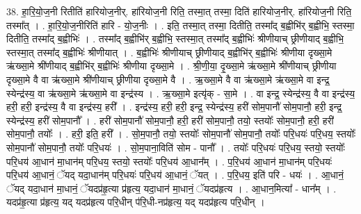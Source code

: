 \documentclass[17pt]{extarticle}
\begin{document}
38. हा॒रि॒यो॒ज॒नी रितीति॑ हारियोज॒नीर्. हा॑रियोज॒नी रिति॒ तस्मा॒त् तस्मा॒ दिति॑ हारियोज॒नीर्. हा॑रियोज॒नी रिति॒ तस्मा᳚त् । . हा॒रि॒यो॒ज॒नीरिति॑ हारि - यो॒ज॒नीः । . इति॒ तस्मा॒त् तस्मा॒ दितीति॒ तस्मा᳚द् ब॒ह्वीभि॑र् ब॒ह्वीभि॒ स्तस्मा॒ दितीति॒ तस्मा᳚द् ब॒ह्वीभिः॑ । . तस्मा᳚द् ब॒ह्वीभि॑र् ब॒ह्वीभि॒ स्तस्मा॒त् तस्मा᳚द् ब॒ह्वीभिः॑ श्रीणीयाच् छ्रीणीयाद् ब॒ह्वीभि॒ स्तस्मा॒त् तस्मा᳚द् ब॒ह्वीभिः॑ श्रीणीयात् । . ब॒ह्वीभिः॑ श्रीणीयाच् छ्रीणीयाद् ब॒ह्वीभि॑र् ब॒ह्वीभिः॑ श्रीणीया दृख्सा॒मे ऋ॑ख्सा॒मे श्री॑णीयाद् ब॒ह्वीभि॑र् ब॒ह्वीभिः॑ श्रीणीया दृख्सा॒मे । . श्री॒णी॒या॒ दृ॒ख्सा॒मे ऋ॑ख्सा॒मे श्री॑णीयाच् छ्रीणीया दृख्सा॒मे वै वा ऋ॑ख्सा॒मे श्री॑णीयाच् छ्रीणीया दृख्सा॒मे वै । . ऋ॒ख्सा॒मे वै वा ऋ॑ख्सा॒मे ऋ॑ख्सा॒मे वा इन्द्र॒ स्येन्द्र॑स्य॒ वा ऋ॑ख्सा॒मे ऋ॑ख्सा॒मे वा इन्द्र॑स्य । . ऋ॒ख्सा॒मे इत्यृ॑क् - सा॒मे । . वा इन्द्र॒ स्येन्द्र॑स्य॒ वै वा इन्द्र॑स्य॒ हरी॒ हरी॒ इन्द्र॑स्य॒ वै वा इन्द्र॑स्य॒ हरी᳚ । . इन्द्र॑स्य॒ हरी॒ हरी॒ इन्द्र॒ स्येन्द्र॑स्य॒ हरी॑ सोम॒पानौ॑ सोम॒पानौ॒ हरी॒ इन्द्र॒ स्येन्द्र॑स्य॒ हरी॑ सोम॒पानौ᳚ । . हरी॑ सोम॒पानौ॑ सोम॒पानौ॒ हरी॒ हरी॑ सोम॒पानौ॒ तयो॒ स्तयोः᳚ सोम॒पानौ॒ हरी॒ हरी॑ सोम॒पानौ॒ तयोः᳚ । . हरी॒ इति॒ हरी᳚ । . सो॒म॒पानौ॒ तयो॒ स्तयोः᳚ सोम॒पानौ॑ सोम॒पानौ॒ तयोः᳚ परि॒धयः॑ परि॒धय॒ स्तयोः᳚ सोम॒पानौ॑ सोम॒पानौ॒ तयोः᳚ परि॒धयः॑ । . सो॒म॒पाना॒विति॑ सोम - पानौ᳚ । . तयोः᳚ परि॒धयः॑ परि॒धय॒ स्तयो॒ स्तयोः᳚ परि॒धय॑ आ॒धान॑ मा॒धान॑म् परि॒धय॒ स्तयो॒ स्तयोः᳚ परि॒धय॑ आ॒धान᳚म् । . प॒रि॒धय॑ आ॒धान॑ मा॒धान॑म् परि॒धयः॑ परि॒धय॑ आ॒धानं॒ ॅयद् यदा॒धान॑म् परि॒धयः॑ परि॒धय॑ आ॒धानं॒ ॅयत् । . प॒रि॒धय॒ इति॑ परि - धयः॑ । . आ॒धानं॒ ॅयद् यदा॒धान॑ मा॒धानं॒ ॅयदप्र॑हृ॒त्या प्र॑हृत्य॒ यदा॒धान॑ मा॒धानं॒ ॅयदप्र॑हृत्य । . आ॒धान॒मित्या᳚ - धान᳚म् । . यदप्र॑हृ॒त्या प्र॑हृत्य॒ यद् यदप्र॑हृत्य परि॒धीन् प॑रि॒धी-नप्र॑हृत्य॒ यद् यदप्र॑हृत्य परि॒धीन् । \newline
\end{document}
